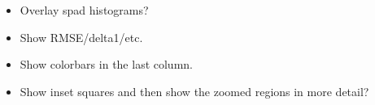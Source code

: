 \begin{itemize}
\item Overlay spad histograms?
\item Show RMSE/delta1/etc.
\item Show colorbars in the last column.
\item Show inset squares and then show the zoomed regions in more detail?
\end{itemize}


